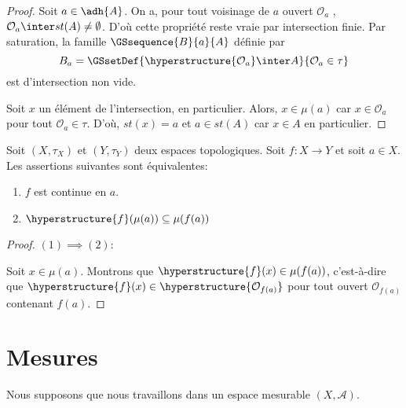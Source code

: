 \documentclass[a4paper, 12pt]{report}
\begin{document}
\ifdefined\outputproof
\begin{proof}
	Soit $a \in \adh{A}$. On a, pour tout voisinage de $a$ ouvert
	$\mathcal{O}_{a}$ , $\mathcal{O}_{a} \inter st(A) \neq \emptyset$.
	D'où cette propriété reste vraie par intersection finie. Par saturation, la
	famille $\GSsequence{B}{a}{A}$ définie par
	\begin{equation}
		B_{a} = \GSsetDef{\hyperstructure{\mathcal{O}_{a}} \inter
	A}{\mathcal{O}_{a} \in \tau}
	\end{equation}
	est d'intersection non vide.

	Soit $x$ un élément de l'intersection, en particulier. Alors, $x \in \mu(a)$ car $x \in
	\mathcal{O}_{a}$ pour tout $\mathcal{O}_{a} \in \tau$. D'où, $st(x) = a$ et
	$a \in st(A)$ car $x \in A$ en particulier.
\end{proof}
\fi

\begin{proposition}
	Soit $(X, \tau_{X})$ et $(Y, \tau_{Y})$ deux espaces topologiques. Soit $f :
	X \rightarrow Y$ et soit $a \in X$.
	Les assertions suivantes sont équivalentes:
	\begin{enumerate}
		\item $f$ est continue en $a$.
		\item $\hyperstructure{f}(\mu(a)) \subseteq \mu(f(a))$
	\end{enumerate}
\end{proposition}

\ifdefined\outputproof
\begin{proof}
	$(1) \implies (2)$:

	Soit $x \in \mu(a)$. Montrons que $\hyperstructure{f}(x) \in \mu(f(a))$,
	c'est-à-dire que $\hyperstructure{f}(x) \in
	\hyperstructure{\mathcal{O}_{f(a)}}$ pour tout ouvert
	$\mathcal{O}_{f(a)}$ contenant $f(a)$.
\end{proof}
\fi

\appendix

\chapter{Mesures}

Nous supposons que nous travaillons dans un espace mesurable $(X, \mathcal{A})$.


\end{document}
